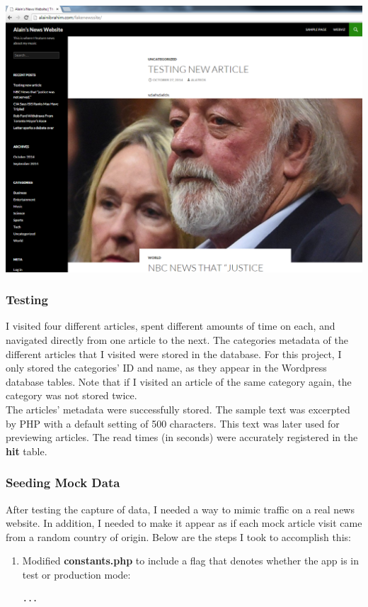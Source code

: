 \documentclass[12pt]{article}
\begin{document}
{\noindent\includegraphics[scale=0.4]{img/fakenewssite_main} 

\newpage

\subsubsection{Testing} 
I visited four different articles, spent different amounts of time on each, and navigated directly from one article to the next.
\noindent The categories metadata of the different articles that I visited were stored in the database. For this project, I only stored the categories' ID and name, as they appear in the Wordpress database tables. Note that if I visited an article of the same category again, the category was not stored twice. \\
The articles' metadata were successfully stored. The sample text was excerpted by PHP with a default setting of 500 characters. This text was later used for previewing articles. The read times (in seconds) were accurately registered in the \textbf{hit} table. 

\subsubsection{Seeding Mock Data}
After testing the capture of data, I needed a way to mimic traffic on a real news website. In addition, I needed to make it appear as if each mock article visit came from a random country of origin. Below are the steps I took to accomplish this:

\begin{enumerate}
\item{Modified \textbf{constants.php} to include a flag that denotes whether the app is in test or production mode:}
\begin{lstlisting}[basicstyle=\scriptsize]
...


\end{lstlisting}
\end{enumerate}}
\end{document}
